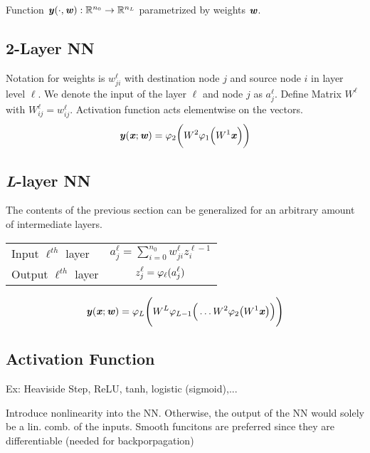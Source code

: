 Function $\textbf{\textit{y}}(\cdot,\textbf{\textit{w}}): \mathbb{R}^{n_0}\rightarrow\mathbb{R}^{n_L}$ parametrized by weights $\textbf{\textit{w}}$.

\subsection{2-Layer NN}
    Notation for weights is $w_{ji}^\ell$ with destination node $j$ and source node $i$ in layer level $\ell$. We denote the input of the layer $\ell$ and node $j$ as $a_j^\ell$.
    Define Matrix $W^\ell$ with $W_{ij}^\ell = w_{ij}^\ell$. Activation function acts elementwise on the vectors.
    \begin{equation*}
        \textbf{\textit{y}}(\textbf{\textit{x}};\textbf{\textit{w}}) = \varphi_2\bigg(W^2\varphi_1\Big(W^1\textbf{\textit{x}}\Big)\bigg)
    \end{equation*}
\subsection{\textit{L}-layer NN}
    The contents of the previous section can be generalized for an arbitrary amount of intermediate layers.
     \begin{center}
            \renewcommand{\arraystretch}{1.3}{\begin{tabular}{l|c}
                Input $\ell^{th}$ layer & $\displaystyle a_j^\ell = \sum_{i=0}^{n_0} w_{ji}^\ell z_i^{\ell - 1}$\\
                Output $\ell^{th}$ layer & $\displaystyle z_j^\ell = \varphi_{\ell}(a_j^\ell)$
            \end{tabular}}
    \end{center}
    \begin{equation*}
        \textbf{\textit{y}}(\textbf{\textit{x}};\textbf{\textit{w}}) = \varphi_L\Bigg(W^L\varphi_{L-1}\Big(\dots W^2\varphi_2\big(W^1\textbf{\textit{x}}\big)\Big)\Bigg)
    \end{equation*}

\subsection{Activation Function}
    Ex: Heaviside Step, ReLU, tanh, logistic (sigmoid),...
    
    Introduce nonlinearity into the NN. Otherwise, the output of the NN would solely be a lin. comb. of the inputs. Smooth funcitons are preferred since they are differentiable (needed for backporpagation)
    
